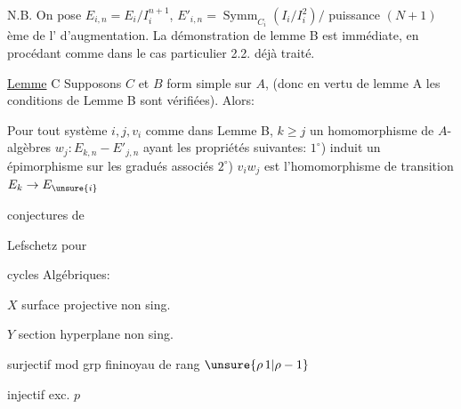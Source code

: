 N.B. On pose $E_{i,n}=E_i/I_i^{n+1}$, $E'_{i,n}=\operatorname{Symm}_{C_i}(I_i/I_i^2)/$ puissance $(N+1)$ème de l' d'augmentation. La démonstration de lemme B est immédiate, en procédant comme dans le cas particulier 2.2. déjà traité.

\uline{Lemme} C Supposons $C$ et $B$ form simple sur $A$, (donc en vertu de lemme A les conditions de Lemme B sont vérifiées). Alors:

 Pour tout  système $i,j,v_i$ comme dans Lemme B,  $k\geq j$  un homomorphisme de $A$-algèbres $w_j:E_{k,n}\mathbin{-}E'_{j,n}$ ayant les propriétés suivantes: $1^\circ$)  induit un épimorphisme sur les gradués associés $2^\circ$) $v_iw_j$ est l'homomorphisme de transition $E_k\to E_{\unsure{i}}$

conjectures de

Lefschetz pour

cycles Algébriques:

$X$ surface projective non sing.

$Y$ section hyperplane non sing.

surjectif mod grp fini\quad noyau de rang $\unsure{\rho\,1|\rho-1}$

injectif exc. $p$

